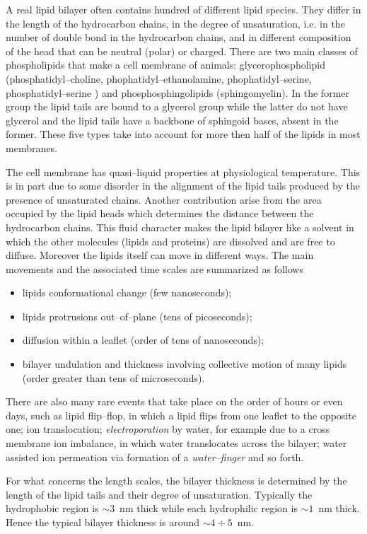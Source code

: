 A real lipid bilayer often contains hundred of different lipid species. They differ in the length of the 
hydrocarbon chains, in the degree of unsaturation, i.e. in the number of double bond in the hydrocarbon chains, 
and in different composition of the head that can be neutral (polar) or charged. There are two main classes of 
phospholipids that make a cell membrane of animals: glycerophospholipid (phosphatidyl--choline, 
phophatidyl--ethanolamine, phophatidyl--serine, phosphatidyl--serine ) and phosphosphingolipids (sphingomyelin). 
In the former group the lipid tails are bound to a glycerol group while the latter do not have glycerol and the 
lipid tails have a backbone of sphingoid bases, absent in the former. These five types take into account for more 
then half of the lipids in most membranes.

The cell membrane has quasi--liquid properties at physiological temperature. This is in part due to some disorder 
in the alignment of the lipid tails produced by the presence of unsaturated chains. Another contribution arise 
from the area occupied by the lipid heads which determines the distance between the hydrocarbon chains. This 
fluid character makes the lipid bilayer like a solvent in which the other molecules (lipids and proteins) are 
dissolved and are free to diffuse. Moreover the lipids itself can move in different ways. The main movements and 
the associated time scales are summarized as follows
\begin{itemize}
	\item lipids conformational change (few nanoseconds);
	\item lipids protrusions out--of--plane (tens of picoseconds);
	\item diffusion within a leaflet (order of tens of nanoseconds);
	\item bilayer undulation and thickness involving collective motion of many lipids (order greater than tens of microseconds).%
\end{itemize}
There are also many rare events that take place on the order of hours or even days, such as lipid flip--flop, in 
which a lipid flips from one leaflet to the opposite one; ion translocation; \textit{electroporation} by water, 
for example due to a cross membrane ion imbalance, in which water translocates across the bilayer; water assisted 
ion permeation via formation of a \textit{water--finger} and so forth.

For what concerns the length scales, the bilayer thickness is determined by the length of the lipid tails and 
their degree of unsaturation. Typically the hydrophobic region is $\sim 3$~nm thick while each hydrophilic 
region is $\sim 1$~nm thick. Hence the typical bilayer thickness is around $\sim 4\div 5$~nm.

